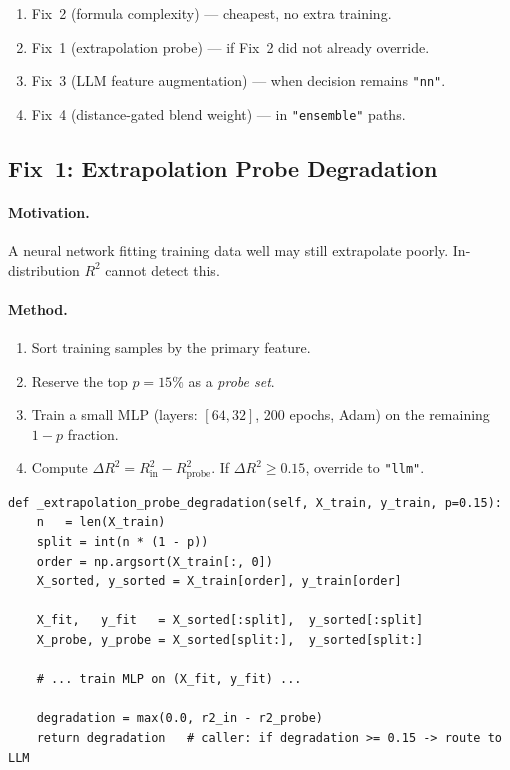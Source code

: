\documentclass[11pt,a4paper]{article}
\begin{document}
\begin{enumerate}
  \item Fix~2 (formula complexity) — cheapest, no extra training.
  \item Fix~1 (extrapolation probe) — if Fix~2 did not already override.
  \item Fix~3 (LLM feature augmentation) — when decision remains \texttt{"nn"}.
  \item Fix~4 (distance-gated blend weight) — in \texttt{"ensemble"} paths.
\end{enumerate}

\subsection{Fix~1: Extrapolation Probe Degradation}

\paragraph{Motivation.}
A neural network fitting training data well may still extrapolate poorly.
In-distribution $R^2$ cannot detect this.

\paragraph{Method.}

\begin{enumerate}
  \item Sort training samples by the primary feature.
  \item Reserve the top $p = 15\%$ as a \emph{probe set}.
  \item Train a small MLP (layers: $[64, 32]$, 200 epochs, Adam) on the
        remaining $1-p$ fraction.
  \item Compute $\Delta R^2 = R^2_{\text{in}} - R^2_{\text{probe}}$.
        If $\Delta R^2 \geq 0.15$, override to \texttt{"llm"}.
\end{enumerate}

\begin{lstlisting}[caption={Extrapolation probe core logic.}]
def _extrapolation_probe_degradation(self, X_train, y_train, p=0.15):
    n   = len(X_train)
    split = int(n * (1 - p))
    order = np.argsort(X_train[:, 0])
    X_sorted, y_sorted = X_train[order], y_train[order]

    X_fit,   y_fit   = X_sorted[:split],  y_sorted[:split]
    X_probe, y_probe = X_sorted[split:],  y_sorted[split:]

    # ... train MLP on (X_fit, y_fit) ...

    degradation = max(0.0, r2_in - r2_probe)
    return degradation   # caller: if degradation >= 0.15 -> route to LLM
\end{lstlisting}
\end{document}
